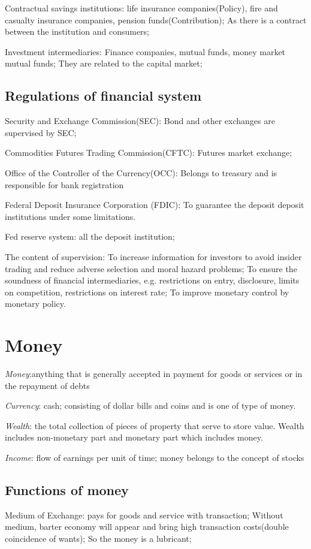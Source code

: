 \documentclass[10pt, a4paper]{article}
\begin{document}
            Contractual savings institutions: life insurance companies(Policy), fire and casualty insurance companies, pension funds(Contribution); As there is a contract between the institution and consumers;
            
            Investment intermediaries: Finance companies, mutual funds, money market mutual funds; They are related to the capital market;
    
    \subsection{Regulations of financial system}
        Security and Exchange Commission(SEC): Bond and other exchanges are supervised by SEC;
        
        Commodities Futures Trading Commission(CFTC): Futures market exchange; 

        Office of the Controller of the Currency(OCC): Belongs to treasury and is responsible for bank registration 

        Federal Deposit Insurance Corporation (FDIC): To guarantee the deposit  deposit institutions under some limitations.

        Fed reserve system: all the deposit institution; 

        The content of supervision: To increase information for investors to avoid insider trading and reduce adverse selection and moral hazard problems; To ensure the soundness of financial intermediaries, e.g. restrictions on entry, disclosure, limits on competition, restrictions on interest rate; To improve monetary control by monetary policy.
\newpage


\section{Money}
    \emph{Money}:anything that is generally accepted in payment for goods or services or in the repayment of debts
    
   \emph{Currency}: cash; consisting of dollar bills and coins and is one of type of money.
    
    \emph{Wealth}: the total collection of pieces of property that serve to store value. Wealth includes non-monetary part and monetary part which includes money.
    
    \emph{Income}: flow of earnings per unit of time; money belongs to the concept of stocks

    \subsection{Functions of money}
        Medium of Exchange: pays for goods and service with transaction; Without medium, barter economy will appear and bring high transaction costs(double coincidence of wants); So the money is a lubricant; 
        
\end{document}
